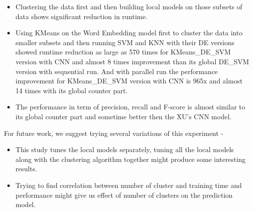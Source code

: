\documentclass[sigconf]{acmart}
\newcommand{\bi}{\begin{itemize}[leftmargin=0.4cm]}
\newcommand{\ei}{\end{itemize}}
\theoremstyle{break}
\begin{document}
    \bi
        \item Clustering the data first and then building local models on those subsets of data shows significant reduction in runtime.
        \item Using KMeans on the Word Embedding model first to cluster the data into smaller subsets and then running SVM and KNN with their DE versions showed runtime reduction as large as 570 times for KMeans\_DE\_SVM version with CNN and almost 8 times improvement than its global DE\_SVM version with sequential run. And with parallel run the performance improvement for KMeans\_DE\_SVM version with CNN is 965x and almost 14 times with its global counter part.
        \item The performance in term of precision, recall and F-score is almost similar to its global counter part and sometime better then the XU's CNN model.
    \ei
    
    
    
    For future work, we suggest trying several variations of this experiment - 
    
    \begin{itemize}
        \item This study tunes the local models separately, tuning all the local models along with the clustering algorithm together might produce some interesting results.
        \item Trying to find correlation between number of cluster and training time and performance might give us effect of number of clusters on the prediction model.
    \end{itemize}



 
\end{document}
